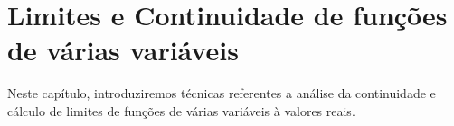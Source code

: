 \chapter{Limites e Continuidade de funções de várias variáveis}
Neste capítulo, introduziremos técnicas referentes a análise da continuidade e cálculo de limites de funções de várias variáveis à valores reais.


